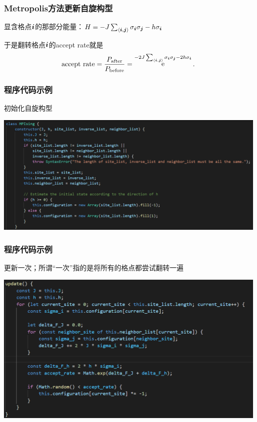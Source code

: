 \documentclass[UTF8]{ctexbeamer}
\DeclareMathOperator{\ee}{e}
\begin{document}
\begin{frame}
\frametitle{Metropolis方法更新自旋构型}

显含格点$\vb*{i}$的那部分能量：$H = - J \sum_{\langle \vb*{i}, \vb*{j} \rangle} \sigma_{\vb*{i}} \sigma_{\vb*{j}} - h \sigma_{\vb*{i}}$

\begin{center}
     
\end{center}   

于是翻转格点$\vb*{i}$的accept rate就是
\begin{equation}
    \text{accept rate} = \frac{P_\text{after}}{P_\text{before}} = \ee^{- 2 J \sum_{\langle \vb*{i}, \vb*{j} \rangle} \sigma_{\vb*{i}} \sigma_{\vb*{j}} - 2 h \sigma_{\vb*{i}} }.
\end{equation}

\end{frame}

\begin{frame}
\frametitle{程序代码示例}

初始化自旋构型

\begin{center}
    \includegraphics[width=\textwidth]{code-MPIsing-initial.PNG}
\end{center}

\end{frame}

\begin{frame}
\frametitle{程序代码示例}

更新一次；所谓“一次”指的是将所有的格点都尝试翻转一遍

\begin{center}
    \includegraphics[width=\textwidth]{code-MPIsing-update.PNG}
\end{center}    

\end{frame}
\end{document}
